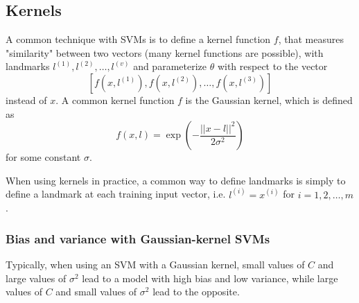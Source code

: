 \documentclass{article}
\begin{document}
\subsection{Kernels}
A common technique with SVMs is to define a kernel function $f$, that measures "similarity" between two vectors (many kernel functions are possible), with landmarks $l^{(1)}, l^{(2)}, \dots, l^{(v)}$ and parameterize $\theta$ with respect to the vector
$$\left[f(x, l^{(1)}), f(x, l^{(2)}), \dots, f(x, l^{(3)})\right]$$
instead of $x$. A common kernel function $f$ is the Gaussian kernel, which is defined as
$$f(x, l) = \exp\left(-\frac{||x - l||^2}{2\sigma^2}\right)$$
for some constant $\sigma$.

When using kernels in practice, a common way to define landmarks is simply to define a landmark at each training input vector, i.e. $l^{(i)} = x^{(i)}$ for $i = 1, 2, \dots, m$.

\subsubsection{Bias and variance with Gaussian-kernel SVMs}
Typically, when using an SVM with a Gaussian kernel, small values of $C$ and large values of $\sigma^2$ lead to a model with high bias and low variance, while large values of $C$ and small values of $\sigma^2$ lead to the opposite.
\end{document}
